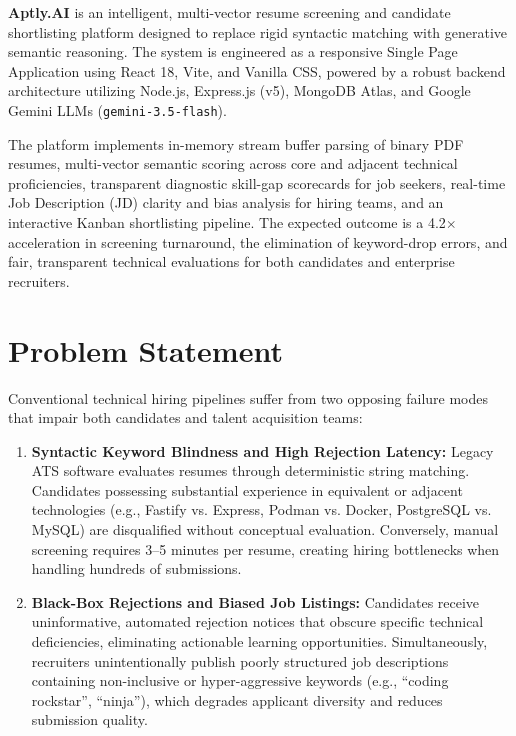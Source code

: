 \documentclass[12pt, a4paper]{article}
\begin{document}
\textbf{Aptly.AI} is an intelligent, multi-vector resume screening and candidate shortlisting platform designed to replace rigid syntactic matching with generative semantic reasoning. The system is engineered as a responsive Single Page Application using React 18, Vite, and Vanilla CSS, powered by a robust backend architecture utilizing Node.js, Express.js (v5), MongoDB Atlas, and Google Gemini LLMs (\texttt{gemini-3.5-flash}). 

The platform implements in-memory stream buffer parsing of binary PDF resumes, multi-vector semantic scoring across core and adjacent technical proficiencies, transparent diagnostic skill-gap scorecards for job seekers, real-time Job Description (JD) clarity and bias analysis for hiring teams, and an interactive Kanban shortlisting pipeline. The expected outcome is a 4.2$\times$ acceleration in screening turnaround, the elimination of keyword-drop errors, and fair, transparent technical evaluations for both candidates and enterprise recruiters.

\section{Problem Statement}
Conventional technical hiring pipelines suffer from two opposing failure modes that impair both candidates and talent acquisition teams:
\begin{enumerate}[label=\textbf{\arabic*.}]
    \item \textbf{Syntactic Keyword Blindness and High Rejection Latency:} Legacy ATS software evaluates resumes through deterministic string matching. Candidates possessing substantial experience in equivalent or adjacent technologies (e.g., Fastify vs. Express, Podman vs. Docker, PostgreSQL vs. MySQL) are disqualified without conceptual evaluation. Conversely, manual screening requires 3–5 minutes per resume, creating hiring bottlenecks when handling hundreds of submissions.
    \item \textbf{Black-Box Rejections and Biased Job Listings:} Candidates receive uninformative, automated rejection notices that obscure specific technical deficiencies, eliminating actionable learning opportunities. Simultaneously, recruiters unintentionally publish poorly structured job descriptions containing non-inclusive or hyper-aggressive keywords (e.g., ``coding rockstar'', ``ninja''), which degrades applicant diversity and reduces submission quality.
\end{enumerate}
\end{document}
